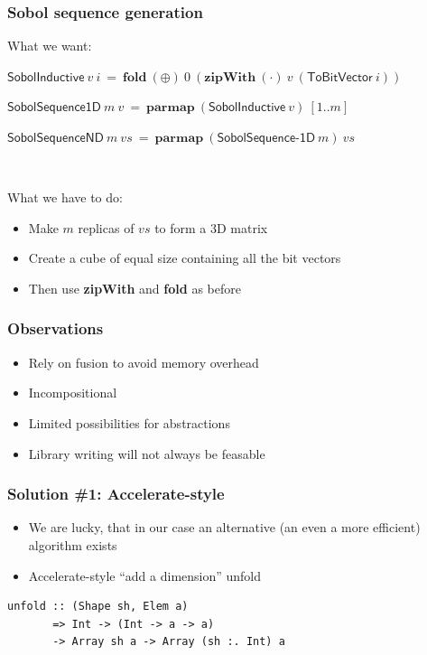 \documentclass{beamer}
\begin{document}
\begin{frame}[fragile]
  \frametitle{Sobol sequence generation}

What we want:

  \quad$\mathsf{SobolInductive}~v~i~=~\textbf{fold}~(\oplus)~0~(\textbf{zipWith}~(\cdot)~v~(\textsf{ToBitVector}~i))$
  ~\vspace{2mm}\pause
  
  \quad$\mathsf{SobolSequence1D}~m~v~=~\textbf{parmap}~(\textsf{SobolInductive}~v)~[1..m]$
  ~\vspace{2mm}\pause

  \quad$\mathsf{SobolSequenceND}~m~vs~=~\textbf{parmap}~(\textsf{SobolSequence-1D}~m)~vs$

~\vspace{5mm}\pause

What we have to do:
\begin{itemize}
\item Make $m$ replicas of $vs$ to form a 3D matrix
\item Create a cube of equal size containing all the bit vectors
\item Then use \textbf{zipWith} and \textbf{fold} as before
\end{itemize}
\end{frame}

\begin{frame}[fragile]
  \frametitle{Observations}

  \begin{itemize}
  \item<1-> Rely on fusion to avoid memory overhead
  \item<2-> Incompositional
  \item<3-> Limited possibilities for abstractions
  \item<4-> Library writing will not always be feasable
  \end{itemize}
\end{frame}

\begin{frame}[fragile]
  \frametitle{Solution \#1: Accelerate-style}
  \begin{itemize}
  \item We are lucky, that in our case an alternative (an even a
    more efficient) algorithm
    exists
  \item Accelerate-style ``add a dimension'' unfold
  \end{itemize}

{\footnotesize
\begin{verbatim}
unfold :: (Shape sh, Elem a)
       => Int -> (Int -> a -> a)
       -> Array sh a -> Array (sh :. Int) a
\end{verbatim} }

\end{frame}
\end{document}
